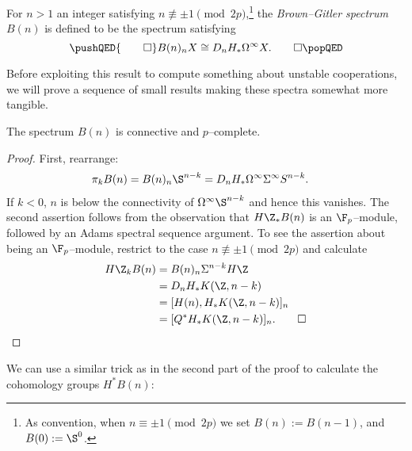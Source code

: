 \begin{corollary}\label{BrownGitlerSpectraDefn}
For \(n > 1\) an integer satisfying \(n \not\equiv \pm 1 \pmod{2p}\),\footnote{As convention, when \(n \equiv \pm 1 \pmod{2p}\) we set \(B(n) := B(n-1)\), and \(B(0) := \S^0\).} the \textit{Brown--Gitler spectrum} \(B(n)\) is defined to be the spectrum satisfying \[\pushQED{\qed}B(n)_n X \cong D_n H_* \Loops^\infty X. \qedhere\popQED\]
\end{corollary}

Before exploiting this result to compute something about unstable cooperations, we will prove a sequence of small results making these spectra somewhat more tangible.

\begin{lemma}
The spectrum \(B(n)\) is connective and \(p\)--complete.
\end{lemma}
\begin{proof}
First, rearrange:
\begin{align*}
\pi_k B(n) & = B(n)_n \S^{n-k} = D_n H_* \Loops^\infty \Susp^\infty S^{n-k}.
\end{align*}
If \(k < 0\), \(n\) is below the connectivity of \(\Loops^\infty \S^{n-k}\) and hence this vanishes.  The second assertion follows from the observation that \(H\Z_* B(n)\) is an \(\F_p\)--module, followed by an Adams spectral sequence argument.  To see the assertion about being an \(\F_p\)--module, restrict to the case \(n \not\equiv \pm 1 \pmod{2p}\) and calculate
\begin{align*}
H\Z_k B(n) & = B(n)_n \Susp^{n-k} H\Z \\
& = D_n H_* K(\Z, n-k) \\
& = [H(n), H_* K(\Z, n-k)]_n \\
& = [Q^* H_* K(\Z, n-k)]_n. \qedhere
\end{align*}
\end{proof}

We can use a similar trick as in the second part of the proof to calculate the cohomology groups \(H^* B(n)\):

